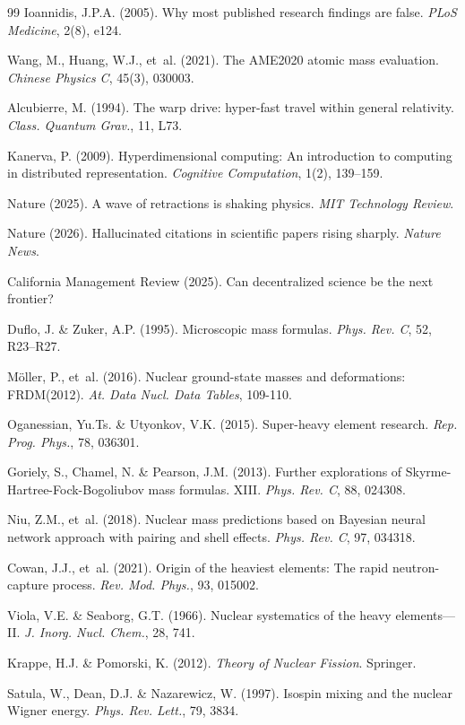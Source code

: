 \documentclass[letterpaper,11pt]{article}
\begin{document}
\begin{thebibliography}{99}
 Ioannidis, J.P.A. (2005).
Why most published research findings are false. \textit{PLoS Medicine}, 2(8), e124.

 Wang, M., Huang, W.J., et~al. (2021).
The AME2020 atomic mass evaluation. \textit{Chinese Physics C}, 45(3), 030003.

 Alcubierre, M. (1994).
The warp drive: hyper-fast travel within general relativity. \textit{Class. Quantum Grav.}, 11, L73.

 Kanerva, P. (2009).
Hyperdimensional computing: An introduction to computing in distributed representation. \textit{Cognitive Computation}, 1(2), 139--159.

 Nature (2025).
A wave of retractions is shaking physics. \textit{MIT Technology Review}.

 Nature (2026).
Hallucinated citations in scientific papers rising sharply. \textit{Nature News}.

 California Management Review (2025).
Can decentralized science be the next frontier?

 Duflo, J. \& Zuker, A.P. (1995).
Microscopic mass formulas. \textit{Phys. Rev. C}, 52, R23--R27.

 M\"oller, P., et~al. (2016).
Nuclear ground-state masses and deformations: FRDM(2012). \textit{At. Data Nucl. Data Tables}, 109-110.

 Oganessian, Yu.Ts. \& Utyonkov, V.K. (2015).
Super-heavy element research. \textit{Rep. Prog. Phys.}, 78, 036301.

 Goriely, S., Chamel, N. \& Pearson, J.M. (2013).
Further explorations of Skyrme-Hartree-Fock-Bogoliubov mass formulas. XIII. \textit{Phys. Rev. C}, 88, 024308.

 Niu, Z.M., et~al. (2018).
Nuclear mass predictions based on Bayesian neural network approach with pairing and shell effects. \textit{Phys. Rev. C}, 97, 034318.

 Cowan, J.J., et~al. (2021).
Origin of the heaviest elements: The rapid neutron-capture process. \textit{Rev. Mod. Phys.}, 93, 015002.

 Viola, V.E. \& Seaborg, G.T. (1966).
Nuclear systematics of the heavy elements---II. \textit{J. Inorg. Nucl. Chem.}, 28, 741.

 Krappe, H.J. \& Pomorski, K. (2012).
\textit{Theory of Nuclear Fission}. Springer.

 Satula, W., Dean, D.J. \& Nazarewicz, W. (1997).
Isospin mixing and the nuclear Wigner energy. \textit{Phys. Rev. Lett.}, 79, 3834.
\end{thebibliography}
\end{document}
